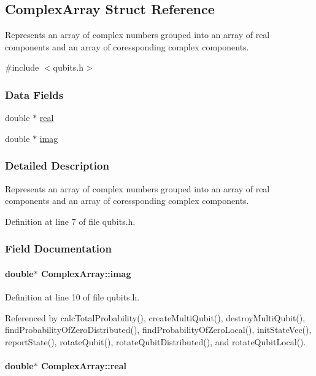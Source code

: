 \hypertarget{structComplexArray}{
\subsection{ComplexArray Struct Reference}
\label{structComplexArray}
}


Represents an array of complex numbers grouped into an array of real components and an array of coressponding complex components.  


{\ttfamily \#include $<$qubits.h$>$}\subsubsection*{Data Fields}
\begin{DoxyCompactItemize}
\item 
double $\ast$ \hyperlink{structComplexArray_a1cf9fd31d6dce5ef618d2bcf3e4f8b69}{real}
\item 
double $\ast$ \hyperlink{structComplexArray_aa409fd14e1ff3e1fdcc53cc4eb77a7a8}{imag}
\end{DoxyCompactItemize}


\subsubsection{Detailed Description}
Represents an array of complex numbers grouped into an array of real components and an array of coressponding complex components. 

Definition at line 7 of file qubits.h.

\subsubsection{Field Documentation}
\hypertarget{structComplexArray_aa409fd14e1ff3e1fdcc53cc4eb77a7a8}{
\paragraph[{imag}]{\setlength{\rightskip}{0pt plus 5cm}double$\ast$ {\bf ComplexArray::imag}}\hfill}
\label{structComplexArray_aa409fd14e1ff3e1fdcc53cc4eb77a7a8}


Definition at line 10 of file qubits.h.

Referenced by calcTotalProbability(), createMultiQubit(), destroyMultiQubit(), findProbabilityOfZeroDistributed(), findProbabilityOfZeroLocal(), initStateVec(), reportState(), rotateQubit(), rotateQubitDistributed(), and rotateQubitLocal().\hypertarget{structComplexArray_a1cf9fd31d6dce5ef618d2bcf3e4f8b69}{
\paragraph[{real}]{\setlength{\rightskip}{0pt plus 5cm}double$\ast$ {\bf ComplexArray::real}}\hfill}
\label{structComplexArray_a1cf9fd31d6dce5ef618d2bcf3e4f8b69}



